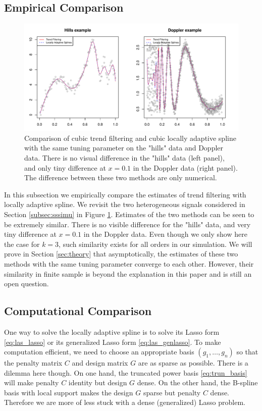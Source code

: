 \documentclass[a4paper]{article}
\begin{document}
\subsection{Empirical Comparison}
\label{subsec:emplasvstf}

\begin{figure}[t!]
\centering
\includegraphics[width = 1\textwidth]{Figures/Figure7.pdf}
\caption{Comparison of cubic trend filtering and cubic locally adaptive spline with the same tuning parameter on the "hills" data and Doppler data. There is no visual difference in the "hills" data (left panel), and only tiny difference at $x= 0.1$ in the Doppler data (right panel). The difference between these two methods are only numerical.}
\label{fig:Figure7_lasvstf}
\end{figure}

In this subsection we empirically compare the estimates of trend filtering with locally adaptive spline. We revisit the two heterogeneous signals considered in Section \ref{subsec:sssimu} in Figure \ref{fig:Figure7_lasvstf}. Estimates of the two methods can be seen to be extremely similar. There is no visible difference for the "hills" data, and very tiny difference at $x = 0.1$ in the Doppler data. Even though we only show here the case for $k = 3$, such similarity exists for all orders in our simulation. We will prove in Section \ref{sec:theory} that asymptotically, the estimates of these two methods with the same tuning parameter converge to each other. However, their similarity in finite sample is beyond the explanation in this paper and is still an open question.

\subsection{Computational Comparison}
One way to solve the locally adaptive spline is to solve its Lasso form \eqref{eq:las_lasso} or its generalized Lasso form \eqref{eq:las_genlasso}. To make computation efficient, we need to choose an appropriate basis $(g_1,\ldots,g_n)$ so that the penalty matrix $C$ and design matrix $G$ are as sparse as possible. There is a dilemma here though. On one hand, the truncated power basis \eqref{eq:trun_basis} will make penalty $C$ identity but design $G$ dense. On the other hand, the B-spline basis with local support makes the design $G$ sparse but penalty $C$ dense. Therefore we are more of less stuck with a dense (generalized) Lasso problem.
\end{document}
